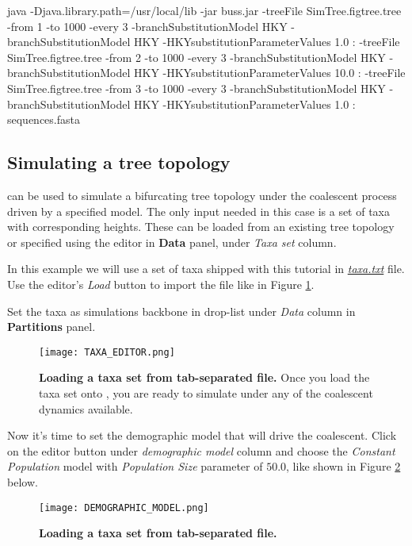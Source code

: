 \begin{code}
java -Djava.library.path=/usr/local/lib -jar buss.jar 
-treeFile SimTree.figtree.tree -from 1 -to 1000 -every 3 -branchSubstitutionModel HKY -branchSubstitutionModel HKY -HKYsubstitutionParameterValues 1.0 :
-treeFile SimTree.figtree.tree -from 2 -to 1000 -every 3 -branchSubstitutionModel HKY -branchSubstitutionModel HKY -HKYsubstitutionParameterValues 10.0 :
-treeFile SimTree.figtree.tree -from 3 -to 1000 -every 3 -branchSubstitutionModel HKY -branchSubstitutionModel HKY -HKYsubstitutionParameterValues 1.0 :
sequences.fasta
\end{code}

\subsection{Simulating a tree topology}
{\bussname} can be used to simulate a bifurcating tree topology under the coalescent process driven by a specified model. 
The only input needed in this case is a set of taxa with corresponding heights. 
These can be loaded from an existing tree topology or specified using the editor in \textbf{Data} panel, under \emph{Taxa set} column.

In this example we will use a set of taxa shipped with this tutorial in \href{http://rega.kuleuven.be/cev/ecv/software/buss_files/taxa.txt}{\emph{taxa.txt}} file. Use the editor's \emph{Load} button to import the file like in Figure \ref{fig:TaxaEditor}.

Set the taxa as simulations backbone in drop-list under \emph{Data} column in \textbf{Partitions} panel.

\begin{figure}[h!]
\centering
\texttt{[image: TAXA\_EDITOR.png]} 
\caption{
{ \footnotesize 
{\bf Loading a taxa set from tab-separated file.}
Once you load the taxa set onto {\bussname}, you are ready to simulate under any of the coalescent dynamics available.
} %
}
\label{fig:TaxaEditor}
\end{figure}   

Now it's time to set the demographic model that will drive the coalescent. Click on the editor button under \emph{demographic model} column and choose the \emph{Constant Population} model with \emph{Population Size} parameter of $50.0$, like shown in Figure \ref{fig:DemoModel} below.

\begin{figure}[h!]
\centering
\texttt{[image: DEMOGRAPHIC\_MODEL.png]} 
\caption{
{ \footnotesize 
{\bf Loading a taxa set from tab-separated file.}
} %
}
\label{fig:DemoModel}
\end{figure}  

